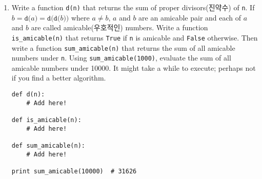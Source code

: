 \documentclass[../main.tex]{subfiles}
\begin{document}
\begin{enumerate}
\item Write a function \texttt{d(n)} that returns the sum of proper divisors(진약수) of \texttt{n}.
If $b = \texttt{d($a$)} = \texttt{d(d($b$))}$ where $a \neq b$, $a$ and $b$ are an amicable pair and each of $a$ and $b$ are called amicable(우호적인) numbers.
Write a function \texttt{is\_amicable(n)} that returns \texttt{True} if \texttt{n} is amicable and \texttt{False} otherwise.
Then write a function \texttt{sum\_amicable(n)} that returns the sum of all amicable numbers under \texttt{n}.
Using \texttt{sum\_amicable(1000)}, evaluate the sum of all amicable numbers under 10000.
It might take a while to execute; perhaps not if you find a better algorithm.
\begin{verbatim}
def d(n):
	# Add here!
	
def is_amicable(n):
	# Add here!

def sum_amicable(n):
	# Add here!
	
print sum_amicable(10000)  # 31626
\end{verbatim}
\end{enumerate}
\end{document}
